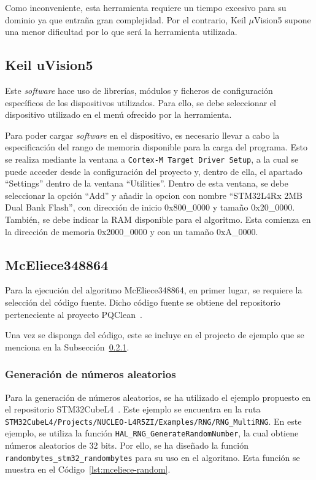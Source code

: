 Como inconveniente, esta herramienta requiere un tiempo excesivo para su dominio ya que entraña gran complejidad.
Por el contrario, Keil $\mu$Vision5 supone una menor dificultad por lo que será la herramienta utilizada.


\subsection{Keil uVision5}\label{subsec:keil}

Este \textit{software} hace uso de librerías, módulos y ficheros de configuración específicos de los dispositivos utilizados.
Para ello, se debe seleccionar el dispositivo utilizado en el menú ofrecido por la herramienta.

Para poder cargar \textit{software} en el dispositivo, es necesario llevar a cabo la especificación del rango de memoria disponible para la carga del programa.
Esto se realiza mediante la ventana a \texttt{Cortex-M Target Driver Setup}, a la cual se puede acceder desde la configuración del proyecto y, dentro de ella, el apartado ``Settings'' dentro de la ventana ``Utilities''.
Dentro de esta ventana, se debe seleccionar la opción ``Add'' y añadir la opcion con nombre ``STM32L4Rx 2MB Dual Bank Flash'', con dirección de inicio 0x800\_0000 y tamaño 0x20\_0000.
También, se debe indicar la RAM disponible para el algoritmo.
Esta comienza en la dirección de memoria 0x2000\_0000 y con un tamaño 0xA\_0000.

\subsection{McEliece348864}\label{subsec:mceliece-stm}

Para la ejecución del algoritmo McEliece348864, en primer lugar, se requiere la selección del código fuente.
Dicho código fuente se obtiene del repositorio perteneciente al proyecto PQClean~\cite{pqclean-github}.

Una vez se disponga del código, este se incluye en el projecto de ejemplo que se menciona en la Subsección~\ref{subsubsec:stm32-random}.


\subsubsection{Generación de números aleatorios}\label{subsubsec:stm32-random}

Para la generación de números aleatorios, se ha utilizado el ejemplo propuesto en el repositorio STM32CubeL4~\cite{stm32cubeL4}.
Este ejemplo se encuentra en la ruta \texttt{STM32CubeL4/Projects/NUCLEO-L4R5ZI/Examples/RNG/RNG\_MultiRNG}.
En este ejemplo, se utiliza la función \texttt{HAL\_RNG\_GenerateRandomNumber}, la cual obtiene números aleatorios de 32 bits.
Por ello, se ha diseñado la función \texttt{randombytes\_stm32\_randombytes} para su uso en el algoritmo.
Esta función se muestra en el Código~\ref{lst:mceliece-random}.

